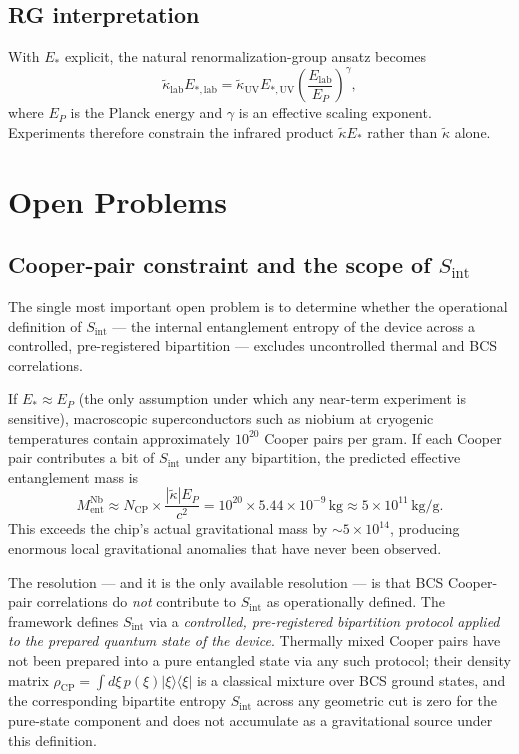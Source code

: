 \documentclass[11pt]{article}
\begin{document}
\subsection{RG interpretation}

With $E_*$ explicit, the natural renormalization-group ansatz becomes
\begin{equation}
\tilde{\kappa}_{\mathrm{lab}}E_{*,\mathrm{lab}} = \tilde{\kappa}_{\mathrm{UV}}E_{*,\mathrm{UV}}\left(\frac{E_{\mathrm{lab}}}{E_P}\right)^\gamma,
\end{equation}
where $E_P$ is the Planck energy and $\gamma$ is an effective scaling exponent. Experiments therefore constrain the infrared product $\tilde{\kappa}E_*$ rather than $\tilde{\kappa}$ alone.

\section{Open Problems}\label{sec:open-problems}

\subsection{Cooper-pair constraint and the scope of $S_{\mathrm{int}}$}

The single most important open problem is to determine whether the operational definition
of $S_{\mathrm{int}}$ --- the internal entanglement entropy of the device across a controlled,
pre-registered bipartition --- excludes uncontrolled thermal and BCS correlations.

If $E_* \approx E_P$ (the only assumption under which any near-term experiment is sensitive),
macroscopic superconductors such as niobium at cryogenic temperatures contain approximately
$10^{20}$ Cooper pairs per gram.  If each Cooper pair contributes a bit of $S_{\mathrm{int}}$
under any bipartition, the predicted effective entanglement mass is
\begin{equation}
M_{\mathrm{ent}}^{\mathrm{Nb}} \approx N_{\mathrm{CP}}\times\frac{|\tilde{\kappa}|E_P}{c^2}
= 10^{20}\times 5.44\times10^{-9}\,\mathrm{kg} \approx 5\times10^{11}\,\mathrm{kg/g}.
\end{equation}
This exceeds the chip's actual gravitational mass by $\sim\!5\times10^{14}$, producing enormous
local gravitational anomalies that have never been observed.

The resolution --- and it is the only available resolution --- is that BCS Cooper-pair
correlations do \emph{not} contribute to $S_{\mathrm{int}}$ as operationally defined.  The
framework defines $S_{\mathrm{int}}$ via a \emph{controlled, pre-registered bipartition protocol
applied to the prepared quantum state of the device}.  Thermally mixed Cooper pairs have not
been prepared into a pure entangled state via any such protocol; their density matrix
$\rho_{\mathrm{CP}} = \int d\xi\,p(\xi)|\xi\rangle\langle\xi|$ is a classical mixture over
BCS ground states, and the corresponding bipartite entropy $S_{\mathrm{int}}$ across any
geometric cut is zero for the pure-state component and does not accumulate as a gravitational
source under this definition.
\end{document}
